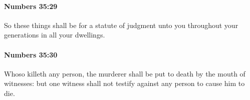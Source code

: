 		\paragraph{Numbers 35:29} %
			\label{NUMBERS-35-29}

			So these things shall be for a statute of judgment unto you throughout your generations in all your dwellings.


		\paragraph{Numbers 35:30} %
			\label{NUMBERS-35-30}

			Whoso killeth any person, the murderer shall be put to death by the mouth of witnesses: but one witness shall not testify against any person to cause him to die.


